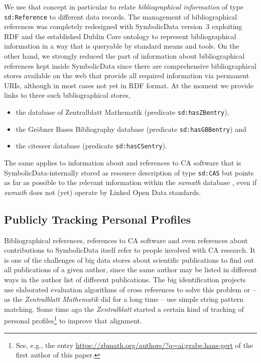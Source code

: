 \documentclass{llncs}
\newcommand{\SD}{{\sc Symbolic\-Data}}
\begin{document}
We use that concept in particular to relate \emph{bibliographical information}
of type \texttt{sd:Reference} to different data records.  The management of
bibliographical re\-fe\-ren\-ces was completely redesigned with {\SD}
version~3 exploiting RDF and the established Dublin Core ontology
\cite{dcterms} to represent bibliographical information in a way that is
queryable by standard means and tools. On the other hand, we strongly reduced
the part of information about bibliographical refe\-rences kept inside {\SD}
since there are comprehensive bibliographical stores available on the web that
provide all required information via permanent URIs, although in most cases
not yet in RDF format.  At the moment we provide links to three such
bibliographical stores,
\begin{itemize}
\item the database of Zentralblatt Mathematik (predicate
  \texttt{sd:hasZBentry}), 
\item the Gr\"obner Bases Bibliography database (predicate
  \texttt{sd:hasGBBentry}) and 
\item the citeseer database (predicate \texttt{sd:hasCSentry}).
\end{itemize}

The same applies to information about and references to CA software that is
\SD-internally stored as resource description of type \texttt{sd:CAS} but
points as far as possible to the relevant information within the \emph{swmath}
database \cite{swmath}, even if \emph{swmath} does not (yet) operate by Linked
Open Data standards.

\subsection{Publicly Tracking Personal Profiles}

Bibliographical references, references to CA software and even references
about contributions to {\SD} itself refer to people involved with CA research.
It is one of the challenges of big data stores about scientific publications
to find out all publications of a given author, since the same author may be
listed in different ways in the author list of different publications.  The
big identification projects use elaborated evaluation algorithms of cross
references to solve this problem or -- as the \emph{Zentralblatt Mathematik}
did for a long time -- use simple string pattern matching.  Some time ago the
\emph{Zentralblatt} started a certain kind of tracking of personal
profiles\footnote{See, e.g., the entry
  \url{https://zbmath.org/authors/?q=ai:grabe.hans-gert} of the first author
  of this paper.} to improve that alignment.
\end{document}
